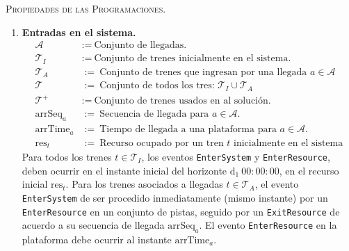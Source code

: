 \documentclass[letter, 10pt]{article}
\begin{document}
\begin{description}
    \item \textsc{Propiedades de las Programaciones.}
    \begin{enumerate}
        \item \textbf{Entradas en el sistema.}
        \begin{align*}
            \mathcal{A} &:= \ \text{Conjunto de llegadas.} \\
            \mathcal{T}_I &:= \ \text{Conjunto de trenes inicialmente en el sistema.} \\
            \mathcal{T}_A &:= \ \text{Conjunto de trenes que ingresan por una llegada } a \in \mathcal{A} \\
            \mathcal{T} &:= \ \text{Conjunto de todos los tres: } \mathcal{T}_I \cup \mathcal{T}_A \\
            \mathcal{T}^{+} &:= \ \text{Conjunto de trenes usados en al solución.} \\
            \text{arrSeq}_a &:= \ \text{Secuencia de llegada para } a \in \mathcal{A}. \\
            \text{arrTime}_a &:= \ \text{Tiempo de llegada a una plataforma para } a \in \mathcal{A}. \\
            \text{res}_t &:=\ \text{Recurso ocupado por un tren } t \text{ inicialmente en el sistema}
        \end{align*}
        Para todos los trenes $t \in \mathcal{T}_I$, los eventos \texttt{EnterSystem} y \texttt{EnterResource},
        deben ocurrir en el instante inicial del horizonte $\text{d}_1 \ 00:00:00$, en el recurso inicial $\text{res}_t$. Para los trenes asociados a llegadas $t \in \mathcal{T}_A$, el evento \texttt{EnterSystem} de ser procedido inmediatamente (mismo instante) por un \texttt{EnterResource} en un conjunto de pistas, seguido por un \texttt{ExitResource} de acuerdo a su secuencia de llegada $\text{arrSeq}_a$. El evento \texttt{EnterResource} en la plataforma debe ocurrir al instante $\text{arrTime}_a$.


\end{enumerate}
\end{description}
\end{document}
